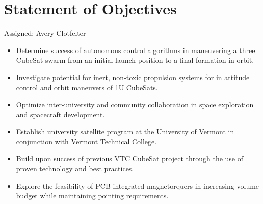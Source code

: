 \section{Statement of Objectives}
Assigned: Avery Clotfelter

\begin{itemize}
  \item Determine success of autonomous control algorithms in
    maneuvering a three CubeSat swarm from an initial launch position to a
    final formation in orbit.
  \item Investigate potential for inert, non-toxic propulsion systems
    for in attitude control and orbit maneuvers of 1U CubeSats.
  \item Optimize inter-university and community collaboration in space
    exploration and spacecraft development.
  \item Establish university satellite program at the University of
    Vermont in conjunction with Vermont Technical College.
  \item Build upon success of previous VTC CubeSat project through the use of proven technology and best practices.
  \item Explore the feasibility of PCB-integrated magnetorquers in
    increasing volume budget while maintaining pointing requirements.

\end{itemize}

